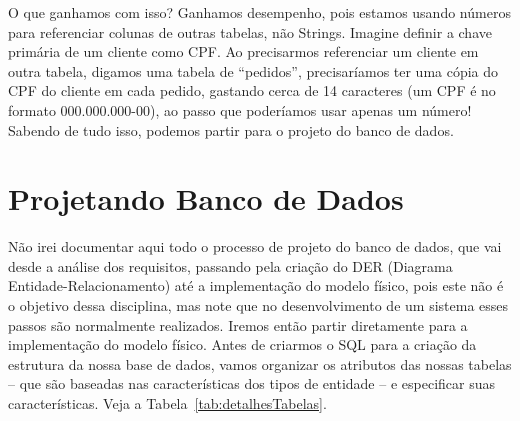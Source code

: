 O que ganhamos com isso? Ganhamos desempenho, pois estamos usando números para referenciar colunas de outras tabelas, não Strings. Imagine definir a chave primária de um cliente como CPF. Ao precisarmos referenciar um cliente em outra tabela, digamos uma tabela de ``pedidos'', precisaríamos ter uma cópia do CPF do cliente em cada pedido, gastando cerca de 14 caracteres (um CPF é no formato 000.000.000-00), ao passo que poderíamos usar apenas um número! Sabendo de tudo isso, podemos partir para o projeto do banco de dados.


\section{Projetando Banco de Dados}

Não irei documentar aqui todo o processo de projeto do banco de dados, que vai desde a análise dos requisitos, passando pela criação do DER (Diagrama Entidade-Relacionamento) até a implementação do modelo físico, pois este não é o objetivo dessa disciplina, mas note que no desenvolvimento de um sistema esses passos são normalmente realizados. Iremos então partir diretamente para a implementação do modelo físico. Antes de criarmos o SQL para a criação da estrutura da nossa base de dados, vamos organizar os atributos das nossas tabelas – que são baseadas nas características dos tipos de entidade – e especificar suas características. Veja a Tabela~\ref{tab:detalhesTabelas}.

